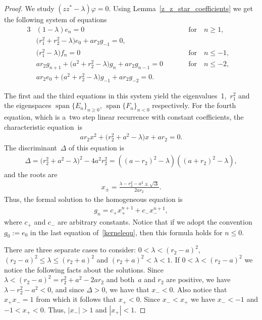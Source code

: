 \documentclass[pdftex]{sigma}
\numberwithin{equation}{section}
\begin{document}
\begin{proof}
We study $(zz^*-\lambda)\varphi=0$.
Using Lemma~\ref{z_z_star_coefficients} we get the following system of equations
\begin{alignat}{3}
& (1-\lambda)e_n=0 && \text{for}\quad n\ge1,&\nonumber
\\
 & \big(r_1^2+ r_2^2-\lambda\big)e_0+ar_2g_{-1}=0,&&&\nonumber
\\
&\big(r_1^2-\lambda\big)f_n=0 &&\text{for}\quad n\le-1,& \label{kernelequ}
\\
& ar_2g_{n+1}+\big(a^2+r_2^2-\lambda\big)g_n+ar_2g_{n-1}=0 \qquad && \text{for}\quad n\le-2,&\nonumber
\\
 & ar_2e_0+\big(a^2+r_2^2-\lambda\big)g_{-1}+ar_2g_{-2}=0.&&&\nonumber
\end{alignat}

The f\/irst and the third equations in this system yield the eigenvalues~1,~$r_1^2$ and the eigenspaces
$\operatorname{span} \{E_n\}_{n\geq 0}$, $\operatorname{span}\{F_n\}_{n< 0}$ respectively.
For the fourth equation, which is a~two step linear recurrence with constant coef\/f\/icients, the characteristic equation~is
\begin{gather*}
ar_2x^2+\big(r_2^2+a^2-\lambda\big)x+ar_2= 0.
\end{gather*}
The discriminant~$\Delta$ of this equation is
\begin{gather*}
\Delta=\big(r_2^2+a^2-\lambda\big)^2-4a^2r_2^2=\left((a-r_2)^2-\lambda\right)\left((a+r_2)^2-\lambda\right),
\end{gather*}
and the roots are
\begin{gather*}
x_{\pm}=\frac{\lambda-r_2^2-a^2 \pm \sqrt{\Delta}}{2ar_2}.
\end{gather*}
Thus, the formal solution to the homogeneous equation is
\begin{gather}
\label{ghomsol}
g_n=c_+x_+^{n+1}+c_-x_-^{n+1},
\end{gather}
where $c_+$ and $c_-$ are arbitrary constants.
Notice that if we adopt the convention $g_0:=e_0$ in the last equation of~\eqref{kernelequ}, then this formula holds for
$n\le 0$.

There are three separate cases to consider: $0<\lambda<(r_2-a)^2$, $(r_2-a)^2\leq \lambda\leq (r_2+a)^2$ and
$(r_2+a)^2<\lambda<1$.
If $0<\lambda<(r_2-a)^2$ we notice the following facts about the solutions.
Since $\lambda<(r_2-a)^2=r_2^2+a^2-2ar_2$ and both~$a$ and $r_2$ are positive, we have $\lambda-r_2^2-a^2<0$, and
since $\Delta>0$, we have that $x_-<0$.
Also notice that $x_+x_-=1$ from which it follows that $x_+<0$.
Since $x_-<x_+$ we have $x_-<-1$ and $-1<x_+<0$.
Thus, $|x_-|>1$ and $|x_+|<1$.


\end{proof}
\end{document}
